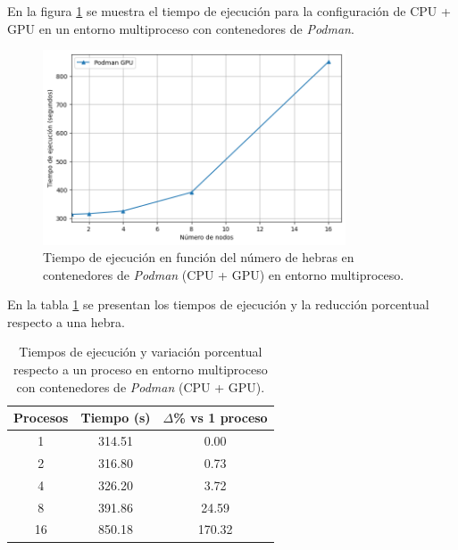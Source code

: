En la figura \ref{fig:multi-node_ubuntu_podman_gpu_time} se muestra el tiempo de ejecución para la configuración de CPU + GPU en un entorno multiproceso con contenedores de \textit{Podman}.

\begin{figure}[H]
    \centering
    \includegraphics[width=0.8\textwidth]{imagenes/cap5/multi-node_ubuntu_podman_gpu_time.png}
    \caption{Tiempo de ejecución en función del número de hebras en contenedores de \textit{Podman} (CPU + GPU) en entorno multiproceso.}
    \label{fig:multi-node_ubuntu_podman_gpu_time}
\end{figure}

En la tabla \ref{tab:multi-node_ubuntu_podman_gpu} se presentan los tiempos de ejecución y la reducción porcentual respecto a una hebra.

\begin{table}[ht]
    \centering
    \begin{tabular}{|c|c|c|}
        \hline
        \textbf{Procesos} & \textbf{Tiempo (s)} & \textbf{$\Delta$\% vs 1 proceso} \\
        \hline
        1                 & 314.51              & 0.00                             \\
        2                 & 316.80              & 0.73                             \\
        4                 & 326.20              & 3.72                             \\
        8                 & 391.86              & 24.59                            \\
        16                & 850.18              & 170.32                           \\
        \hline
    \end{tabular}
    \caption{Tiempos de ejecución y variación porcentual respecto a un proceso en entorno multiproceso con contenedores de \textit{Podman} (CPU + GPU).}
    \label{tab:multi-node_ubuntu_podman_gpu}
\end{table}

